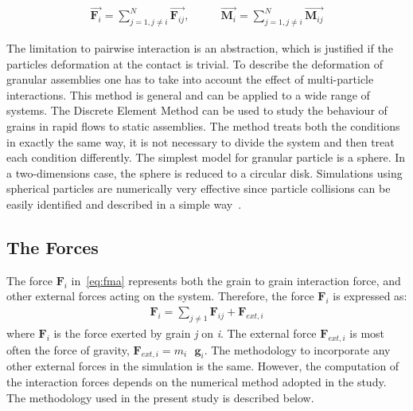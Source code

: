 \begin{align}
   \overrightarrow{{\mathbf{F}}_i}=\sum\limits_{j=1,j\ne 
   i}^{N}{\overrightarrow{\mathbf{F}_{ij}}}, \qquad 
   &\overrightarrow{\mathbf{M}_{i}}=\sum\limits_{j=1,j\ne 
   i}^{N}{\overrightarrow{\mathbf{M}_{ij}}}
\end{align}

The limitation to pairwise interaction is an abstraction, which is justified 
if 
the particles 
deformation at the contact is trivial. To describe the deformation of granular 
assemblies one has 
to take into account the effect of multi-particle interactions. This method is 
general and can be 
applied to a wide range of systems. The Discrete Element Method can be used to 
study the 
behaviour of grains in rapid flows to static assemblies. The method treats 
both 
the conditions in 
exactly the same way, it is not necessary to divide the system and then treat 
each condition 
differently. The simplest model for granular particle is a sphere. In a 
two-dimensions case, the 
sphere is reduced to a circular disk. Simulations using spherical particles 
are 
numerically very 
effective since particle collisions can be easily identified and described in 
a 
simple 
way~\citep{Posch2005}.

% 

\subsection{The Forces}

The force $\mathbf{F}_{\mathit{i}}$ in~\cref{eq:fma} represents both the grain 
to grain 
interaction force, and other external forces acting on the system. Therefore, 
the force 
$\mathbf{F}_{\mathit{i}}$ is expressed as:
\begin{align} \label{eq:f}
 \mathbf{{F}}_{i}=\sum\limits_{j\ne 1}{\mathbf{{F}}_{ij}+\mathbf{{F}}_{ext, i}}
\end{align}
where $\mathbf{F}_{\mathit{i}}$ is the force exerted by grain \textit{j} on 
\textit{i}. The 
external force $\mathbf{F}_{\mathit{ext,i}}$ is most often the force of 
gravity, 
$\mathbf{F}_{\mathit{ext,i}} = m_{\mathit{i}} \mbox{ }\mathbf{g}_{\mathit{i}}$. 
The methodology to 
incorporate any other external forces in the simulation is the same. However, 
the computation of 
the interaction forces depends on the numerical method adopted in the study. 
The methodology used 
in the present study is described below. 

